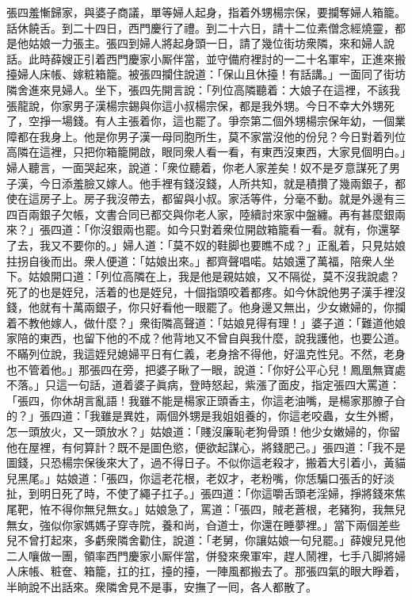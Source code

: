 張四羞慚歸家，與婆子商議，{}單等婦人起身，指着外甥楊宗保，要攔奪婦人箱籠。話休饒舌。到二十四日，西門慶行了禮。到二十六日，請十二位素僧念經燒靈，都是他姑娘一力張主。張四到婦人將起身頭一日，請了幾位街坊衆隣，來和婦人說話。此時薛嫂正引着西門慶家小厮伴當，並守備府裡討的一二十名軍牢，正進來搬擡婦人床帳、嫁粧箱籠。被張四攔住說道：「保山且休擡！有話講。」一面同了街坊隣舍進來見婦人。坐下，張四先開言說：「列位高隣聽着：大娘子在這裡，不該我張龍說，{}你家男子漢楊宗錫與你這小叔楊宗保，都是我外甥。今日不幸大外甥死了，空掙一場錢。有人主張着你，{}這也罷了。爭奈第二個外甥楊宗保年幼，一個業障都在我身上。他是你男子漢一母同胞所生，莫不家當沒他的份兒？今日對着列位高隣在這裡，只把你箱籠開啟，眼同衆人看一看，有東西沒東西，大家見個明白。」婦人聽言，一面哭起來，說道：「衆位聽着，你老人家差矣！奴不是歹意謀死了男子漢，今日添羞臉又嫁人。他手裡有錢沒錢，人所共知，就是積攢了幾兩銀子，都使在這房子上。{}房子我沒帶去，都留與小叔。家活等件，分毫不動。就是外邊有三四百兩銀子欠帳，文書合同已都交與你老人家，陸續討來家中盤纏。再有甚麼銀兩來？」張四道：「你沒銀兩也罷。如今只對着衆位開啟箱籠看一看。就有，你還拏了去，我又不要你的。」婦人道：「莫不奴的鞋脚也要瞧不成？」正亂着，只見姑娘拄拐自後而出。{}衆人便道：「姑娘出來。」都齊聲唱喏。姑娘還了萬福，陪衆人坐下。姑娘開口道：「列位高隣在上，我是他是親姑娘，又不隔從，莫不沒我說處？死了的也是姪兒，活着的也是姪兒，十個指頭咬着都疼。如今休說他男子漢手裡沒錢，他就有十萬兩銀子，你只好看他一眼罷了。他身邊又無出，少女嫩婦的，你攔着不教他嫁人，做什麼？」衆街隣高聲道：「姑娘見得有理！」婆子道：「難道他娘家陪的東西，也留下他的不成？他背地又不曾自與我什麼，{}說我護他，也要公道。不瞞列位說，我這姪兒媳婦平日有仁義，老身捨不得他，好溫克性兒。不然，老身也不管着他。」那張四在旁，把婆子瞅了一眼，{}說道：「你好公平心兒！鳳凰無寶處不落。」只這一句話，道着婆子眞病，登時怒起，紫漲了面皮，指定張四大罵道：「張四，你休胡言亂語！我雖不能是楊家正頭香主，你這老油嘴，是楊家那膫子㒲的？」{}張四道：「我雖是異姓，兩個外甥是我姐姐養的，你這老咬蟲，女生外嚮，怎一頭放火，又一頭放水？」姑娘道：「賤沒廉恥老狗骨頭！他少女嫩婦的，你留他在屋裡，有何算計？既不是圖色慾，便欲起謀心，將錢肥己。」張四道：「我不是圖錢，只恐楊宗保後來大了，過不得日子。不似你這老殺才，搬着大引着小，黃貓兒黑尾。」姑娘道：「張四，你這老花根，老奴才，老粉嘴，你恁騙口張舌的好淡扯，到明日死了時，不使了繩子扛子。」張四道：「你這嚼舌頭老淫婦，掙將錢來焦尾靶，恠不得你無兒無女。」姑娘急了，罵道：「張四，賊老蒼根，老豬狗，我無兒無女，強似你家媽媽子穿寺院，養和尚，㒲道士，你還在睡夢裡。」當下兩個差些兒不曾打起來，多虧衆隣舍勸住，說道：「老舅，你讓姑娘一句兒罷。」薛嫂兒見他二人嚷做一團，領率西門慶家小厮伴當，併發來衆軍牢，趕人鬧裡，七手八脚將婦人床帳、粧奩、箱籠，扛的扛，擡的擡，一陣風都搬去了。{}那張四氣的眼大睜着，半晌說不出話來。衆隣舍見不是事，安撫了一囘，各人都散了。

